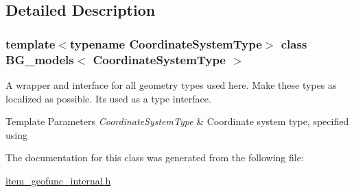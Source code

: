 \subsection{Detailed Description}
\subsubsection*{template$<$typename Coordinate\+System\+Type$>$\newline
class B\+G\+\_\+models$<$ Coordinate\+System\+Type $>$}

A wrapper and interface for all geometry types used here. Make these types as localized as possible. It\textquotesingle{}s used as a type interface. 
\begin{DoxyTemplParams}{Template Parameters}
{\em Coordinate\+System\+Type} & Coordinate system type, specified using \\
\hline
\end{DoxyTemplParams}


The documentation for this class was generated from the following file\+:\begin{DoxyCompactItemize}
\item 
\mbox{\hyperlink{item__geofunc__internal_8h}{item\+\_\+geofunc\+\_\+internal.\+h}}\end{DoxyCompactItemize}
